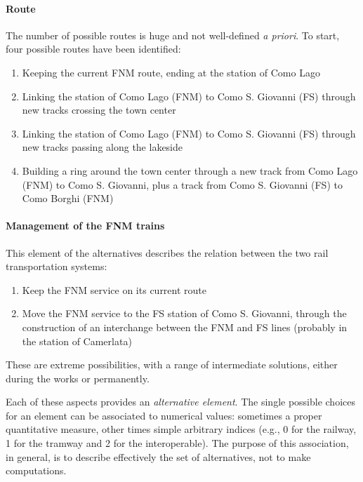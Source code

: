 \paragraph{Route} The number of possible routes is huge and not well-defined \textit{a priori}. To start, four possible routes have been identified: 
\begin{enumerate}
	\item Keeping the current FNM route, ending at the station of Como Lago 
	
	\item Linking the station of Como Lago (FNM) to Como S. Giovanni (FS) through new tracks crossing the town center
	
	\item Linking the station of Como Lago (FNM) to Como S. Giovanni (FS) through new tracks passing along the lakeside
	
	\item Building a ring around the town center through a new track from Como Lago (FNM) to Como S. Giovanni, plus a track from Como S. Giovanni (FS) to Como Borghi (FNM)
\end{enumerate}

\paragraph{Management of the FNM trains} This element of the alternatives describes the relation between the two rail transportation systems:
\begin{enumerate}
	\item Keep the FNM service on its current route
	
	\item Move the FNM service to the FS station of Como S. Giovanni, through the construction of an interchange between the FNM and FS lines (probably in the station of Camerlata)
\end{enumerate}

These are extreme possibilities, with a range of intermediate solutions, either during the works or permanently.

Each of these aspects provides an \textit{alternative element}. The single possible choices for an element can be associated to numerical values: sometimes a proper quantitative measure, other times simple arbitrary indices (e.g., 0 for the railway, 1 for the tramway and 2 for the interoperable). The purpose of this association, in general, is to describe effectively the set of alternatives, not to make computations.

